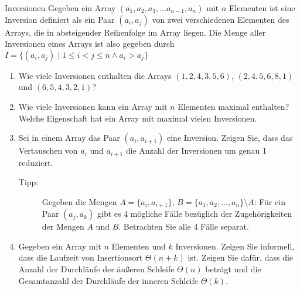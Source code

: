\documentclass[11pt,a4paper]{article}
\begin{document}
\begin{aufgabe}{4}{Inversionen}
    Gegeben ein Array $(a_1, a_2, a_3, \ldots a_{n - 1}, a_n)$ mit $n$ Elementen ist eine Inversion definiert als ein Paar $(a_i, a_j)$ von zwei verschiedenen Elementen des Arrays, die in absteigender Reihenfolge im Array liegen.
    Die Menge aller Inversionen eines Arrays ist also gegeben durch $I = \{(a_i, a_j) \mid 1 \leq i < j \leq n \wedge a_i > a_j \}$
    \begin{enumerate}
        \item Wie viele Inversionen enthalten die Arrays $(1, 2, 4, 3, 5, 6)$, $(2, 4, 5, 6, 8, 1)$ und $(6, 5, 4, 3, 2, 1)$?

        \item Wie viele Inversionen kann ein Array mit $n$ Elementen maximal enthalten? Welche Eigenschaft hat ein Array mit maximal vielen Inversionen.


        \item Sei in einem Array das Paar $(a_i, a_{i + 1})$ eine Inversion. Zeigen Sie, dass das Vertauschen von $a_i$ und $a_{i + 1}$ die Anzahl der Inversionen um genau 1 reduziert.
        \begin{description}
            \item[Tipp:] Gegeben die Mengen $A = \{a_i, a_{i + 1}\}$, $B = \{a_1, a_2, \ldots, a_n\} \setminus A$:
            Für ein Paar $(a_j, a_k)$ gibt es 4 mögliche Fälle bezüglich der Zugehörigkeiten der Mengen $A$ und $B$.
            Betrachten Sie alle 4 Fälle separat.
        \end{description}
        
        \item Gegeben ein Array mit $n$ Elementen und $k$ Inversionen. Zeigen Sie informell, dass die Laufzeit von Insertionsort $\Theta(n + k)$ ist.
        Zeigen Sie dafür, dass die Anzahl der Durchläufe der äußeren Schleife $\Theta(n)$ beträgt und die Gesamtanzahl der Durchläufe der inneren Schleife $\Theta(k)$.

    \end{enumerate}
\end{aufgabe}
\end{document}
